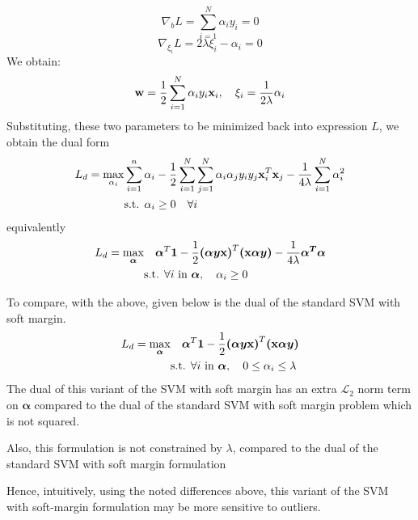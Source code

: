 \documentclass{article}
\newcommand{\mb}[1]{{\mathbf{#1}}}
\newcommand{\msb}[1]{{\boldsymbol{#1}}}
\def\x{{\bf x}}
\def\w{{\bf w}}
\begin{document}
\begin{enumerate}
\begin{itemize}
{    $$
        \nabla_{b}L = \sum_{i=1}^{N} \alpha_i y_i = 0
    $$
    $$
        \nabla_{\xi_i}L = 2\lambda\xi_i - \alpha_i = 0
    $$
    We obtain:
    $$
        \w = \frac{1}{2} \sum_{i=1}^{N} \alpha_i y_i \x_i,\quad 
        \xi_i = \frac{1}{2\lambda} \alpha_i
    $$
    Substituting, these two parameters to be minimized back into expression $L$, we obtain the dual form
    \begin{align*}
        L_{d} = \max_{\alpha_i} & \sum_{i=1}^{n} \alpha_i  - \frac{1}{2} \sum_{i=1}^{N} \sum_{j=1}^{N}\alpha_i \alpha_j y_i y_j \x_i^T \x_j - \frac{1}{4\lambda} \sum_{i=1}^{N} \alpha_i^2\\
        & \hbox{s.t. } \alpha_i \ge 0 \quad \forall i
    \end{align*} equivalently
    \begin{align*}
        L_{d} = \max_{\msb{\alpha}} & { }\quad \msb{\alpha}^{T}\mb{1}  - \frac{1}{2} \msb{(\alpha y\x)}^T\msb{(\x\alpha y)}- \frac{1}{4\lambda}  \msb{\alpha^T\alpha}\\
        & \hbox{s.t. } \forall i \mbox{ in } \msb{\alpha},\quad \alpha_i \ge 0  
    \end{align*}

    To compare, with the above, given below is the dual of the standard SVM with soft margin. 
    \begin{align*}
        L_{d} = \max_{\msb{\alpha}} & { }\quad \msb{\alpha}^{T}\mb{1}  - \frac{1}{2} \msb{(\alpha y\x)}^T \msb{(\x\alpha y)}\\
        & \hbox{s.t. } \forall i \mbox{ in } \msb{\alpha},\quad 0 \leq \alpha_i \le \lambda 
    \end{align*}
    The dual of this variant of the SVM with soft margin has an extra $\mathcal{L}_2$ norm term on $\msb{\alpha}$ compared to the dual of the standard SVM with soft margin problem which is not squared.

    Also, this formulation is not constrained by $\lambda$, compared to the dual of the standard SVM with soft margin formulation

    Hence, intuitively, using the noted differences above, this variant of the SVM with soft-margin formulation may be more sensitive to outliers. 

}


\end{itemize}
\end{enumerate}
\end{document}
